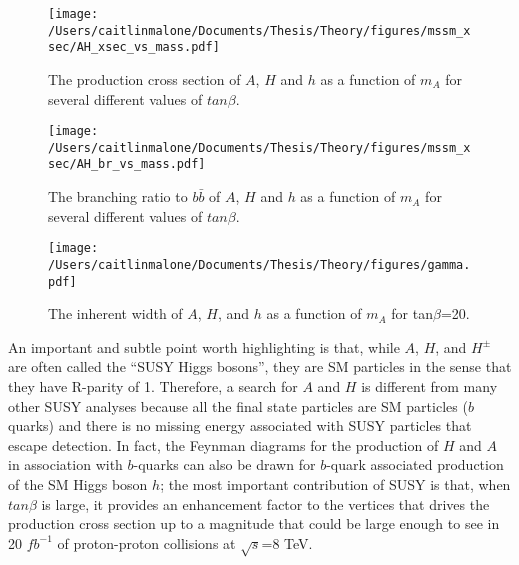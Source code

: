 \begin{figure}
	\centering
	\caption{The production cross section of $A$, $H$ and $h$ as a function of $m_A$ for several different values of $tan\beta$. \label{fig:xsec_vs_mass} }
	\texttt{[image: /Users/caitlinmalone/Documents/Thesis/Theory/figures/mssm\_xsec/AH\_xsec\_vs\_mass.pdf]}
\end{figure}




\begin{figure}
	\centering
	\caption{The branching ratio to $b\bar{b}$ of $A$, $H$ and $h$ as a function of $m_A$ for several different values of $tan\beta$. \label{fig:br_vs_mass} }
	\texttt{[image: /Users/caitlinmalone/Documents/Thesis/Theory/figures/mssm\_xsec/AH\_br\_vs\_mass.pdf]}
\end{figure}


\begin{figure}
	\centering
	\caption{The inherent width of $A$, $H$, and $h$ as a function of $m_A$ for tan$\beta$=20. \label{fig:width}}
	\texttt{[image: /Users/caitlinmalone/Documents/Thesis/Theory/figures/gamma.pdf]}
\end{figure}

An important and subtle point worth highlighting is that, while $A$, $H$, and $H^\pm$ are often called the ``SUSY Higgs bosons'', they are SM particles in the sense that they have R-parity of 1.  Therefore, a search for $A$ and $H$ is different from many other SUSY analyses because all the final state particles are SM particles ($b$ quarks) and there is no missing energy associated with SUSY particles that escape detection.  In fact, the Feynman diagrams for the production of $H$ and $A$ in association with $b$-quarks can also be drawn for $b$-quark associated production of the SM Higgs boson $h$; the most important contribution of SUSY is that, when $tan\beta$ is large, it provides an enhancement factor to the vertices that drives the production cross section up to a magnitude that could be large enough to see in 20 $fb^{-1}$ of proton-proton collisions at $\sqrt{s}$=8 TeV.

%
%


